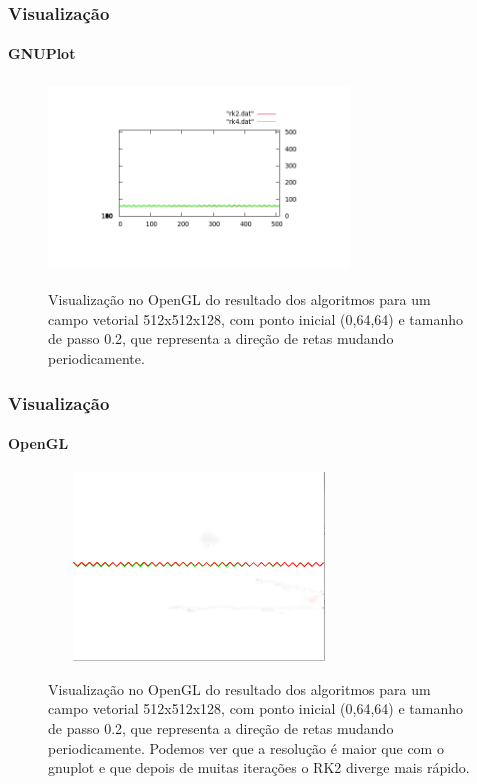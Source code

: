 \documentclass[brazil, 10pt]{beamer}
\begin{document}
\begin{frame}
  \frametitle{Visualização}
  \framesubtitle{GNUPlot}
  
    \begin{figure}
    \begin{center}
      \includegraphics[width=80mm, height=50mm]{img/gnuplot-lines.png}
      \label{fig:2}
      \caption{Visualização no OpenGL do resultado dos algoritmos para um campo vetorial 512x512x128, com ponto inicial (0,64,64) e tamanho de passo 0.2, que representa a direção de retas mudando periodicamente.}
    \end{center}
  \end{figure}
\end{frame}

\begin{frame}
  \frametitle{Visualização}
  \framesubtitle{OpenGL}
  
    \begin{figure}
    \begin{center}
      \includegraphics[width=80mm, height=50mm]{img/opengl-lines.png}
      \label{fig:2}
      \caption{Visualização no OpenGL do resultado dos algoritmos para um campo vetorial 512x512x128, com ponto inicial (0,64,64) e tamanho de passo 0.2, que representa a direção de retas mudando periodicamente. Podemos ver que a resolução é maior que com o gnuplot e que depois de muitas iterações o RK2 diverge mais rápido.}
    \end{center}
  \end{figure}
\end{frame}
\end{document}
